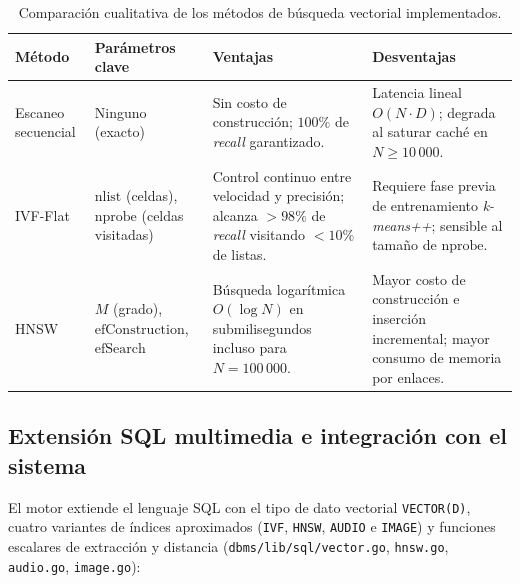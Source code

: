 \documentclass[11pt,a4paper]{article}
\begin{document}
\begin{table}[H]
  \centering
  \small
  \begin{tabular}{@{}p{2.4cm}p{3.4cm}p{4.3cm}p{4.3cm}@{}}
    \toprule
    \textbf{Método} & \textbf{Parámetros clave} & \textbf{Ventajas} & \textbf{Desventajas} \\
    \midrule
    Escaneo secuencial & Ninguno (exacto) & Sin costo de construcción; $100\%$ de \emph{recall} garantizado. & Latencia lineal $O(N \cdot D)$; degrada al saturar caché en $N \ge 10\,000$. \\
    IVF-Flat & $\text{nlist}$ (celdas), $\text{nprobe}$ (celdas visitadas) & Control continuo entre velocidad y precisión; alcanza $>98\%$ de \emph{recall} visitando $<10\%$ de listas. & Requiere fase previa de entrenamiento \emph{k-means++}; sensible al tamaño de $\text{nprobe}$. \\
    HNSW & $M$ (grado), $\text{efConstruction}$, $\text{efSearch}$ & Búsqueda logarítmica $O(\log N)$ en submilisegundos incluso para $N = 100\,000$. & Mayor costo de construcción e inserción incremental; mayor consumo de memoria por enlaces. \\
    \bottomrule
  \end{tabular}
  \caption{Comparación cualitativa de los métodos de búsqueda vectorial implementados.}
  \label{tab:indices-vectoriales}
\end{table}

\subsection{Extensión SQL multimedia e integración con el sistema}
\label{sec:sql-multimedia}

El motor extiende el lenguaje SQL con el tipo de dato vectorial \texttt{VECTOR(D)}, cuatro variantes de índices aproximados (\texttt{IVF}, \texttt{HNSW}, \texttt{AUDIO} e \texttt{IMAGE}) y funciones escalares de extracción y distancia (\texttt{dbms/lib/sql/vector.go}, \texttt{hnsw.go}, \texttt{audio.go}, \texttt{image.go}):
\end{document}
